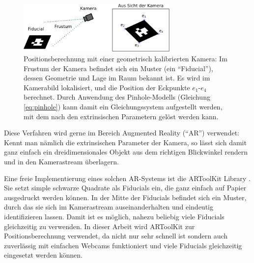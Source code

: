   \begin{figure}[H]
    \centering
    \includegraphics[width=0.7\textwidth]{../graphics/grundlagen/positionsbestimmung.svg}
    \caption[Positionsberechnung mit einer Kamera]{Positionsberechnung mit einer geometrisch kalibrierten Kamera: Im Frustum der Kamera befindet sich ein Muster (ein ``Fiducial''), dessen Geometrie und Lage im Raum bekannt ist. 
   Es wird im Kamerabild lokalisiert, und die Position der Eckpunkte  $e_1$-$e_4$ berechnet. Durch Anwendung des Pinhole-Modells (Gleichung \ref{eq:pinhole}) kann damit ein Gleichungssystem aufgestellt werden, mit dem nach den extrinsischen Parametern gelöst werden kann.}
    \label{fig:positionsbestimmung}
   \end{figure}

   Diese Verfahren wird gerne im Bereich Augmented Reality (``AR'') verwendet:
   Kennt man nämlich die extrinsischen Parameter der Kamera, so lässt sich damit ganz einfach ein dreidimensionales Objekt aus dem richtigen Blickwinkel rendern und in den Kamerastream überlagern.
 
   Eine freie Implementierung eines solchen AR-Systems ist die ARToolKit Library \cite{artoolkit}.
   Sie setzt simple schwarze Quadrate als Fiducials ein, die ganz einfach auf Papier ausgedruckt werden können.
   In der Mitte der Fiducials befindet sich ein Muster, durch das sie sich im Kamerastream auseinanderhalten und eindeutig identifizieren lassen. 
   Damit ist es möglich, nahezu beliebig viele Fiducials gleichzeitig zu verwenden.
   In dieser Arbeit wird ARToolKit zur Positionsberechnung verwendet, da nicht nur sehr schnell ist sondern auch zuverlässig mit einfachen  Webcams funktioniert und viele Fiducials gleichzeitig eingesetzt werden können. 

